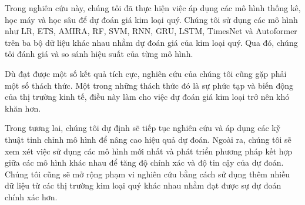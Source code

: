 Trong nghiên cứu này, chúng tôi đã thực hiện việc áp dụng các mô hình thống kê, học máy và học sâu để dự đoán giá kim loại quý. Chúng tôi sử dụng các mô hình như LR, ETS, AMIRA, RF, SVM, RNN, GRU, LSTM, TimesNet và Autoformer trên ba bộ dữ liệu khác nhau nhằm dự đoán giá của kim loại quý. Qua đó, chúng tôi đánh giá và so sánh hiệu suất của từng mô hình.

Dù đạt được một số kết quả tích cực, nghiên cứu của chúng tôi cũng gặp phải một số thách thức. Một trong những thách thức đó là sự phức tạp và biến động của thị trường kinh tế, điều này làm cho việc dự đoán giá kim loại trở nên khó khăn hơn.

Trong tương lai, chúng tôi dự định sẽ tiếp tục nghiên cứu và áp dụng các kỹ thuật tinh chỉnh mô hình để nâng cao hiệu quả dự đoán. Ngoài ra, chúng tôi sẽ xem xét việc sử dụng các mô hình mới nhất và phát triển phương pháp kết hợp giữa các mô hình khác nhau để tăng độ chính xác và độ tin cậy của dự đoán. Chúng tôi cũng sẽ mở rộng phạm vi nghiên cứu bằng cách sử dụng thêm nhiều dữ liệu từ các thị trường kim loại quý khác nhau nhằm đạt được sự dự đoán chính xác hơn.
